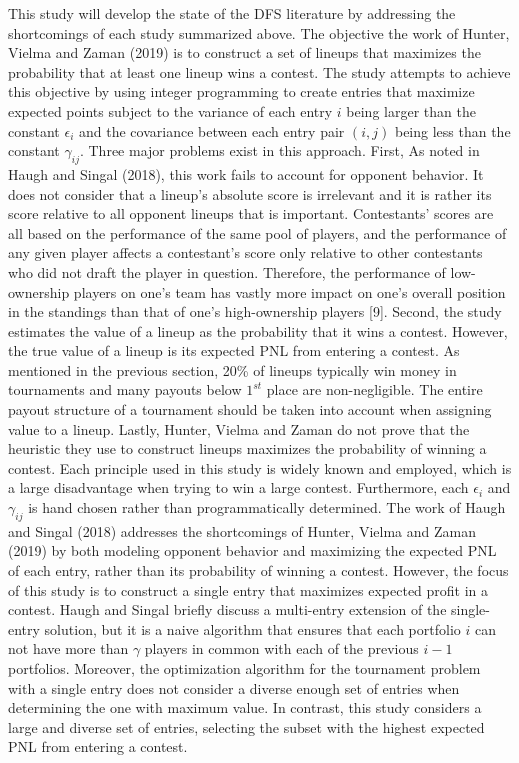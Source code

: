 \documentclass{article}
\begin{document}
This study will develop the state of the DFS literature by addressing the shortcomings of each study summarized above. The objective the work of Hunter, Vielma and Zaman (2019) is to construct a set of lineups that maximizes the probability that at least one lineup wins a contest. The study attempts to achieve this objective by using integer programming to create entries that maximize expected points subject to the variance of each entry $i$ being larger than the constant $\epsilon_{i}$ and the covariance between each entry pair $(i, j)$ being less than the constant $\gamma_{ij}$. Three major problems exist in this approach. First, As noted in Haugh and Singal (2018), this work fails to account for opponent behavior. It does not consider that a lineup's absolute score is irrelevant and it is rather its score relative to all opponent lineups that is important. Contestants' scores are all based on the performance of the same pool of players, and the performance of any given player affects a contestant's score only relative to other contestants who did not draft the player in question. Therefore, the performance of low-ownership players on one's team has vastly more impact on one’s overall position in the standings than that of one's high-ownership players [9]. Second, the study estimates the value of a lineup as the probability that it wins a contest. However, the true value of a lineup is its expected PNL from entering a contest. As mentioned in the previous section, 20\% of lineups typically win money in tournaments and many payouts below $1^{st}$ place are non-negligible. The entire payout structure of a tournament should be taken into account when assigning value to a lineup. Lastly, Hunter, Vielma and Zaman do not prove that the heuristic they use to construct lineups maximizes the probability of winning a contest. Each principle used in this study is widely known and employed, which is a large disadvantage when trying to win a large contest. Furthermore, each $\epsilon_{i}$ and $\gamma_{ij}$ is hand chosen rather than programmatically determined. The work of Haugh and Singal (2018) addresses the shortcomings of Hunter, Vielma and Zaman (2019) by both modeling opponent behavior and maximizing the expected PNL of each entry, rather than its probability of winning a contest. However, the focus of this study is to construct a single entry that maximizes expected profit in a contest. Haugh and Singal briefly discuss a multi-entry extension of the single-entry solution, but it is a naive algorithm that ensures that each portfolio $i$ can not have more than $\gamma$ players in common with each of the previous $i-1$ portfolios. Moreover, the optimization algorithm for the tournament problem with a single entry does not consider a diverse enough set of entries when determining the one with maximum value. In contrast, this study considers a large and diverse set of entries, selecting the subset with the highest expected PNL from entering a contest.
\end{document}
